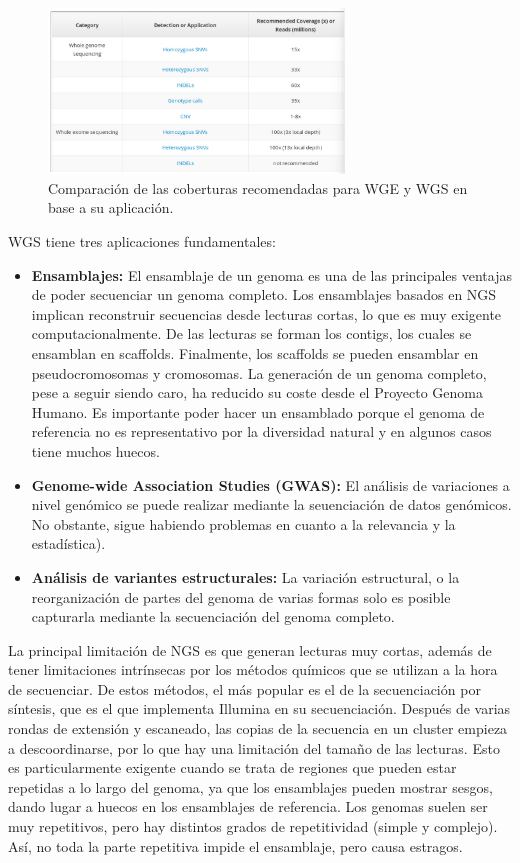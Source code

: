 \begin{figure}[htbp]
\centering
\includegraphics[width = 0.7\textwidth]{figs/wge-wgs.png}
\caption{Comparación de las coberturas recomendadas para WGE y WGS en base a su aplicación.}
\end{figure}

WGS tiene tres aplicaciones fundamentales:
\begin{itemize}
\item \textbf{Ensamblajes:} El ensamblaje de un genoma es una de las principales ventajas de poder secuenciar un genoma completo. Los ensamblajes basados en NGS implican reconstruir secuencias desde lecturas cortas, lo que es muy exigente computacionalmente. De las lecturas se forman los contigs, los cuales se ensamblan en scaffolds. Finalmente, los scaffolds se pueden ensamblar en pseudocromosomas y cromosomas. La generación de un genoma completo, pese a seguir siendo caro, ha reducido su coste desde el Proyecto Genoma Humano. Es importante poder hacer un ensamblado porque el genoma de referencia no es representativo por la diversidad natural y en algunos casos tiene muchos huecos.
\item \textbf{Genome-wide Association Studies (GWAS):} El análisis de variaciones a nivel genómico se puede realizar mediante la seuenciación de datos genómicos. No obstante, sigue habiendo problemas en cuanto a la relevancia y la estadística).
\item \textbf{Análisis de variantes estructurales:} La variación estructural, o la reorganización de partes del genoma de varias formas solo es posible capturarla mediante la secuenciación del genoma completo.
\end{itemize}

La principal limitación de NGS es que generan lecturas muy cortas, además de tener limitaciones intrínsecas por los métodos químicos que se utilizan a la hora de secuenciar. De estos métodos, el más popular es el de la secuenciación por síntesis, que es el que implementa Illumina en su secuenciación. Después de varias rondas de extensión y escaneado, las copias de la secuencia en un cluster empieza a descoordinarse, por lo que hay una limitación del tamaño de las lecturas. Esto es particularmente exigente cuando se trata de regiones que pueden estar repetidas a lo largo del genoma, ya que los ensamblajes pueden mostrar sesgos, dando lugar a huecos en los ensamblajes de referencia. Los genomas suelen ser muy repetitivos, pero hay distintos grados de repetitividad (simple y complejo). Así, no toda la parte repetitiva impide el ensamblaje, pero causa estragos.

